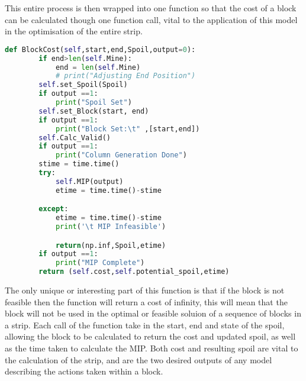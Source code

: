 This entire process is then wrapped into one function so that the cost of a block can be calculated though one function call, vital to the application of this model in the optimisation of the entire strip. 
\begin{lstlisting}[language=python]
	def BlockCost(self,start,end,Spoil,output=0):
		if end>len(self.Mine):
			end = len(self.Mine)
			# print("Adjusting End Position")
		self.set_Spoil(Spoil)
		if output ==1:
			print("Spoil Set")
		self.set_Block(start, end)
		if output ==1:
			print("Block Set:\t" ,[start,end])
		self.Calc_Valid()
		if output ==1:
			print("Column Generation Done")
		stime = time.time()
		try:
			self.MIP(output)
			etime = time.time()-stime

		except:
			etime = time.time()-stime
			print('\t MIP Infeasible')

			return(np.inf,Spoil,etime)
		if output ==1:
			print("MIP Complete")
		return (self.cost,self.potential_spoil,etime)
		\end{lstlisting}
The only unique or interesting part of this function is that if the block is not feasible then the function will return a cost of infinity, this will mean that the block will not be used in the optimal or feasible soluion of a sequence of blocks in a strip. Each call of the function take in the start, end and state of the spoil, allowing the block to be calculated to return the cost and updated spoil, as well as the time taken to calculate the MIP. Both cost and resulting spoil are vital to the calculation of the strip, and are the two desired outputs of any model describing the actions taken within a block. 
